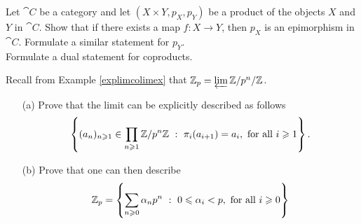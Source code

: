 \vspace*{0.1in}

\begin{problem}\label{prob 6.3c}
Let $\cat{C}$ be a category and let $(X\times Y,p_X,p_Y)$ be a product of the objects $X$ and $Y$ in $\cat{C}$. Show that if there exists a map $f:X \to Y$, then $p_X$ is an epimorphism in $\cat{C}$. Formulate a similar statement for $p_Y$.\\[0.5em]
Formulate a dual statement for coproducts. 
\end{problem}

\vspace*{0.1in}

\begin{problem}\label{prob 6.4}
Recall from Example \ref{explimcolimex} that $\mathbb Z_p = \varprojlim \mathbb Z/p^n/\mathbb Z$.
\begin{itemize}
\item[(a)] Prove that the limit can be explicitly described as follows
\[\left\{(a_n)_{n\geqslant 1} \in \prod_{n\geqslant 1}\mathbb Z/p^n\mathbb Z\ :\ \pi_i(a_{i+1}) = a_i,\ \text{for all }i\geqslant 1\right\}.\]
\item[(b)] Prove that one can then describe
\[\mathbb Z_p = \left\{\sum_{n\geqslant 0}\alpha_np^n\ :\ 0 \leqslant \alpha_i < p,\ \text{for all }i\geqslant 0\right\}\]
\end{itemize}
\end{problem}

\vspace{0.1in}

